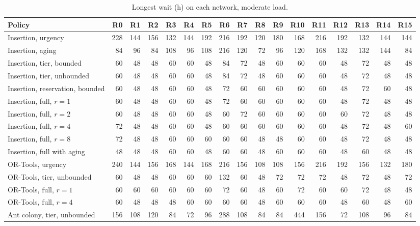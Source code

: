 \begin{table}[!htbp]
\caption{Longest wait (h) on each network, moderate load.}
\label{tab:networks_moderate}
\centering
\footnotesize
\setlength{\tabcolsep}{1.8pt}
\begin{tabular}{lrrrrrrrrrrrrrrrr}
\toprule
Policy & R0 & R1 & R2 & R3 & R4 & R5 & R6 & R7 & R8 & R9 & R10 & R11 & R12 & R13 & R14 & R15 \\
\midrule
Insertion, urgency & 228 & 144 & 156 & 132 & 144 & 192 & 216 & 192 & 120 & 180 & 168 & 216 & 192 & 132 & 144 & 144 \\
Insertion, aging & 84 & 96 & 84 & 108 & 96 & 108 & 216 & 120 & 72 & 96 & 120 & 168 & 132 & 132 & 144 & 84 \\
Insertion, tier, bounded & 60 & 48 & 48 & 60 & 60 & 48 & 84 & 72 & 48 & 60 & 60 & 60 & 48 & 72 & 48 & 48 \\
Insertion, tier, unbounded & 60 & 48 & 48 & 60 & 60 & 48 & 84 & 72 & 48 & 60 & 60 & 60 & 48 & 72 & 48 & 48 \\
Insertion, reservation, bounded & 60 & 48 & 48 & 60 & 60 & 48 & 72 & 60 & 60 & 60 & 60 & 60 & 48 & 72 & 60 & 48 \\
Insertion, full, $r = 1$ & 60 & 48 & 48 & 60 & 60 & 48 & 72 & 60 & 60 & 60 & 60 & 60 & 48 & 72 & 48 & 48 \\
Insertion, full, $r = 2$ & 60 & 48 & 48 & 60 & 60 & 48 & 60 & 72 & 60 & 60 & 60 & 60 & 60 & 72 & 48 & 48 \\
Insertion, full, $r = 4$ & 72 & 48 & 48 & 60 & 60 & 48 & 60 & 60 & 60 & 60 & 60 & 60 & 48 & 72 & 48 & 60 \\
Insertion, full, $r = 8$ & 72 & 48 & 48 & 60 & 60 & 60 & 60 & 60 & 48 & 48 & 60 & 60 & 48 & 72 & 48 & 48 \\
Insertion, full with aging & 48 & 48 & 48 & 60 & 60 & 48 & 60 & 60 & 48 & 60 & 60 & 60 & 48 & 60 & 48 & 48 \\
OR-Tools, urgency & 240 & 144 & 156 & 168 & 144 & 168 & 216 & 156 & 108 & 108 & 156 & 216 & 192 & 156 & 132 & 180 \\
OR-Tools, tier, unbounded & 60 & 48 & 48 & 60 & 60 & 60 & 132 & 60 & 48 & 72 & 72 & 72 & 48 & 72 & 48 & 72 \\
OR-Tools, full, $r = 1$ & 60 & 60 & 60 & 60 & 60 & 60 & 72 & 60 & 48 & 60 & 72 & 60 & 60 & 72 & 48 & 48 \\
OR-Tools, full, $r = 4$ & 60 & 48 & 48 & 48 & 60 & 60 & 60 & 60 & 48 & 60 & 60 & 60 & 48 & 60 & 48 & 60 \\
Ant colony, tier, unbounded & 156 & 108 & 120 & 84 & 72 & 96 & 288 & 108 & 84 & 84 & 444 & 156 & 72 & 108 & 96 & 84 \\

\end{tabular}
\end{table}

